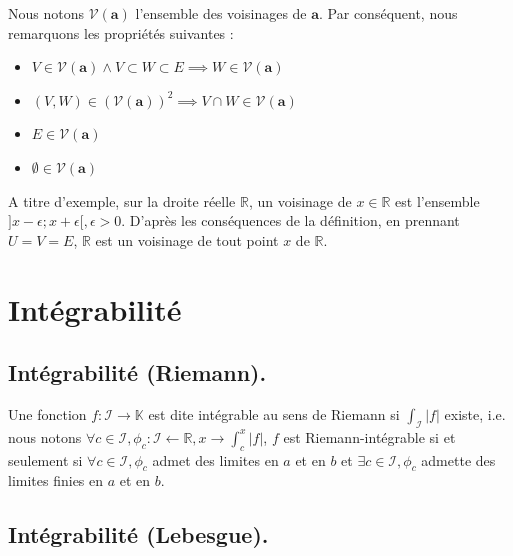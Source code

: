 \noindent Nous notons $\boldsymbol{\mathcal{V}}(\boldsymbol{a})$ l'ensemble des voisinages de $\boldsymbol{a}$. Par conséquent, nous remarquons les propriétés suivantes : 

\begin{itemize}
    \item $V \in \boldsymbol{\mathcal{V}}(\boldsymbol{a}) \wedge V \subset W \subset E \implies W \in \boldsymbol{\mathcal{V}}(\boldsymbol{a})$ \newline
    \item $(V, W) \in (\boldsymbol{\mathcal{V}}(\boldsymbol{a}))^{2} \implies V \cap W \in \boldsymbol{\mathcal{V}}(\boldsymbol{a})$ \newline
    \item $E \in \boldsymbol{\mathcal{V}}(\boldsymbol{a})$ \newline
    \item $\emptyset \in \boldsymbol{\mathcal{V}}(\boldsymbol{a})$ \newline 
\end{itemize}

\noindent A titre d'exemple, sur la droite réelle $\mathbb{R}$, un voisinage de $x \in \mathbb{R}$ est l'ensemble $]x - \epsilon; x + \epsilon[, \epsilon > 0$. D'après les conséquences de la définition, en prennant $U = V = E$, $\mathbb{R}$ est un voisinage de tout point $x$ de $\mathbb{R}$. \newline

\section{Intégrabilité}
\subsection{Intégrabilité (Riemann).}

\noindent Une fonction $f : \mathcal{I} \rightarrow \mathbb{K}$ est dite intégrable au sens de Riemann si $\int_{\mathcal{I}} |f|$ existe, i.e. nous notons
$\forall c \in \mathcal{I}, \phi_c : \mathcal{I} \leftarrow \mathbb{R}, x \longrightarrow \int_{c}^{x}|f|$, $f$ est Riemann-intégrable si et seulement si $\forall c \in \mathcal{I}, \phi_c$ admet des limites en $a$ et en $b$ et $\exists c \in \mathcal{I}, \phi_c$ admette des limites finies en $a$ et en $b$. \newline

\subsection{Intégrabilité (Lebesgue).} 

